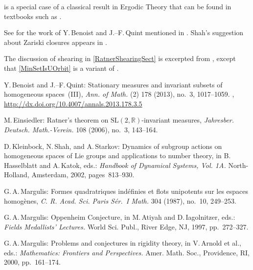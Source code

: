 \begin{notes}
 is a special case of a classical result in Ergodic Theory that can be found in textbooks such as \cite[Thm.~6.19]{Walters}.

See \cite{BenoistQuint-StatMeas3} for the work of Y.\,Benoist and J.--F.\,Quint mentioned in . Shah's suggestion about Zariski closures appears in \cite[end of \S1, p.~232]{Shah-GenByUnip}.

The discussion of shearing in \cref{RatnerShearingSect} is excerpted from \cite[\S1.5]{Morris-RatnersThms}, except that \cref{MinSetIsUOrbit} is a variant of \cite[Prop.~1.6.10]{Morris-RatnersThms}.

\end{notes}


\begin{references}{99}

Y.\,Benoist and J.--F.\,Quint:
Stationary measures and invariant subsets of homogeneous spaces~(III),
\emph{Ann. of Math.} (2) 178 (2013), no.~3, 1017--1059.
,
\maynewline
\url{http://dx.doi.org/10.4007/annals.2013.178.3.5 }

M.\,Einsiedler:
Ratner's theorem on ${\mathrm{SL}}(2,\mathbb{R})$-invariant measures,
\emph{Jahresber. Deutsch. Math.-Verein.} 108 (2006), no.~3, 143--164. 

D.\,Kleinbock, N.\,Shah, and A.\,Starkov:
Dynamics of subgroup actions on homogeneous spaces of Lie groups and applications to number theory,
in B.\,Hasselblatt and A.\,Katok, eds.:
\emph{Handbook of Dynamical Systems, Vol. 1A.}
North-Holland, Amsterdam, 2002, pages~813--930.

G.\,A.\,Margulis:
Formes quadratriques ind\'efinies et flots unipotents sur les espaces homog\`enes,
\emph{C. R. Acad. Sci. Paris S\'er.~I Math.} 304 (1987), no.~10, 249--253. 

G.\,A.\,Margulis:
Oppenheim Conjecture,
in  M.\,Atiyah and D.\,Iagolnitzer, eds.:
\emph{Fields Medallists' Lectures.}
World Sci. Publ., River Edge, NJ, 1997, pp.~272--327.

G.\,A.\,Margulis:
Problems and conjectures in rigidity theory,
in V.\,Arnold et al., eds.:
\emph{Mathematics: Frontiers and Perspectives.}
Amer. Math. Soc., Providence, RI, 2000, pp.~161--174.


\end{references}
